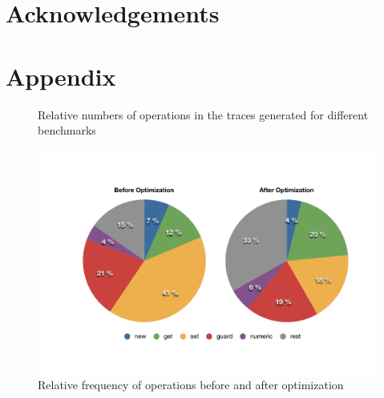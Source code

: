 \documentclass[10pt,preprint]{sigplanconf}
\begin{document}

\section*{Acknowledgements}
\section*{Appendix}
\begin{figure}
    
    \caption{Relative numbers of operations in the traces generated for
    different benchmarks}
    \label{fig:ops_count}
\end{figure}
\begin{figure}
\centering
\includegraphics[width=\textwidth]{figures/ops_pie.pdf}
\caption{Relative frequency of operations before and after optimization}
\label{fig:ops_pie}
\end{figure}


\listoftodos
\end{document}
